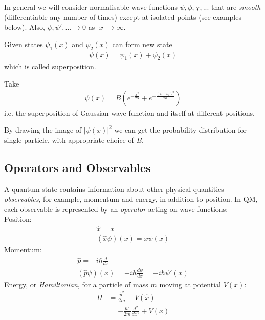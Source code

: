 \documentclass[a4paper]{article}
\begin{document}
In general we will consider normalisable wave functions $\psi,\phi,\chi,...$ that are \emph{smooth} (differentiable any number of times) except at isolated points (see examples below). Also, $\psi,\psi',... \to 0$ as $|x| \to \infty$.

Given states $\psi_1\left(x\right)$ and $\psi_2\left(x\right)$ can form new state
\begin{equation*}
\begin{aligned}
\psi\left(x\right) = \psi_1\left(x\right) + \psi_2\left(x\right)
\end{aligned}
\end{equation*}
which is called superposition.

\begin{eg}
Take
\begin{equation*}
\begin{aligned}
\psi\left(x\right) = B\left(e^{-\frac{x^2}{2\alpha}} + e^{-\frac{\left(x-x_0\right)^2}{2\alpha}}\right)
\end{aligned}
\end{equation*}
i.e. the superposition of Gaussian wave function and itself at different positions.

By drawing the image of $|\psi\left(x\right)|^2$ we can get the probability distribution for single particle, with appropriate choice of $B$.
\end{eg}

\subsection{Operators and Observables}
A quantum state contains information about other physical quantities \emph{observables}, for example, momentum and energy, in addition to position. In QM, each observable is represented by an \emph{operator} acting on wave functions:\\
Position:
\begin{equation*}
\begin{aligned}
\hat{x} = x\\
\left(\hat{x}\psi\right)\left(x\right) = x\psi\left(x\right)
\end{aligned}
\end{equation*}
Momentum:
\begin{equation*}
\begin{aligned}
\hat{p} = -i\hbar \frac{d}{dx}\\
\left(\hat{p}\psi\right)\left(x\right) = -i\hbar \frac{d\psi}{dx} = -i\hbar \psi'\left(x\right)
\end{aligned}
\end{equation*}
Energy, or \emph{Hamiltonian}, for a particle of mass $m$ moving at potential $V\left(x\right)$:
\begin{equation*}
\begin{aligned}
H &= \frac{\hat{p}^2}{2m} + V\left(\hat{x}\right)\\
&= -\frac{\hbar^2}{2m} \frac{d^2}{dx^2} + V\left(x\right)
\end{aligned}
\end{equation*}
\end{document}
